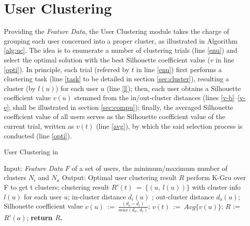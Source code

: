 \section{User Clustering}
\label{sec:uc}


\par Providing the \textit{Feature Data}, the User Clustering module takes the charge of grouping each user concerned into a proper cluster,
as illustrated in  Algorithm \ref{alg:uc}.
%
The idea is to enumerate a number of clustering trials (line \ref{enu}) and select the optimal solution with the best Silhouette coefficient value ($v$ in line \ref{opti}).
In principle, each trial (referred by $t$ in line \ref{enu}) first performs a clustering task (line \ref{task} to be detailed in section \ref{sec:cluster}), resulting a cluster (by $l(u)$) for each user $u$ (line \ref{l});
then, each user obtains a Silhouette coefficient value $v(u)$ stemmed from the in/out-cluster distances (lines \ref{v-b}--\ref{v-e}; shall be illustrated in section \ref{sec:compu});
finally, the averaged Silhouette coefficient value of all users serves as the Silhouette coefficient value of the current trial, written as $v(t)$ (line \ref{avg}), by which the said selection process is conducted (line \ref{opti}).


\begin{algorithm}[t]
\begin{small}
\caption{User Clustering in \sys{}}
\label{alg:uc}
\begin{algorithmic}[1]
\State Input: \textit{Feature Data} $F$  of a set of users, the minimum/maximum number of clusters $N_i$ and $N_a$
\State Output: Optimal user clustering result $R$
\vspace{1ex}
 \label{enu}
    \State perform K-Gru over F to get t clusters;\label{task}
	\State clustering result $R'(t)\ =\ \{(u,\ l(u))\}$ with cluster info $l(u)$ for each user $u$; \label{l}
		\State in-cluster distance $d_i(u)$ \label{v-b};
		\State out-cluster distance $d_o(u)$;
		\State Silhouette coefficient value $v(u)\ :=\ \frac{(d_o - d_i)}{max(d_o,\ d_i)}$; \label{v-e}
	\EndFor
	\State $v(t)\ :=\ Avg\{v(u)\}$; \label{avg}
\EndFor
{} \label{opti}
	\State $R$ := $R'(a)$;
\EndIf
\State \bfseries{return} $R$.
\end{algorithmic}
\end{small}
\end{algorithm}


